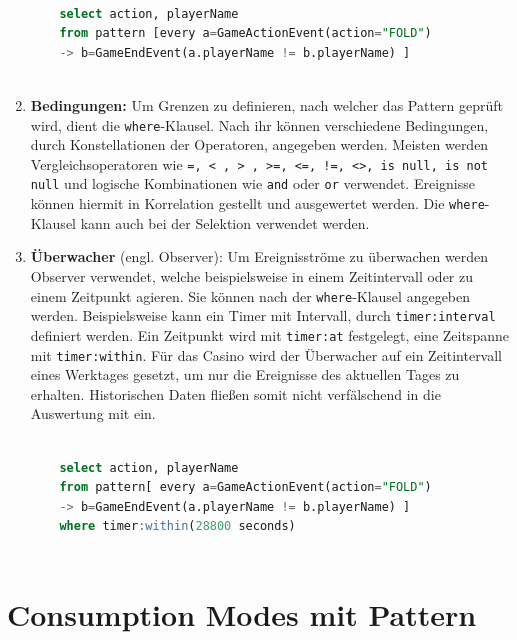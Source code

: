 \begin{enumerate}
	\begin{lstlisting}[caption={Pattern mit Follow-Operator },label=follow_pattern,captionpos=b,language=SQL]
	
	select action, playerName 
	from pattern [every a=GameActionEvent(action="FOLD") 
	-> b=GameEndEvent(a.playerName != b.playerName) ]
	
	\end{lstlisting}
	
	\item \textbf{Bedingungen:}
	Um Grenzen zu definieren, nach welcher das Pattern geprüft wird, dient die \texttt{where}-Klausel. Nach ihr können verschiedene Bedingungen, durch Konstellationen der Operatoren, angegeben werden.
	Meisten werden Vergleichsoperatoren wie \texttt{=, < , > , >=, <=, !=, <>, is null, is not null} und logische Kombinationen wie \texttt{and} oder \texttt{or} verwendet. Ereignisse können hiermit in Korrelation gestellt und ausgewertet werden. Die \texttt{where}- Klausel kann auch bei der Selektion verwendet werden.
	
	\item \textbf{Überwacher} (engl. Observer):
	Um Ereignisströme zu überwachen werden Observer verwendet, welche beispielsweise in einem Zeitintervall oder zu einem Zeitpunkt agieren. Sie können nach der \texttt{where}-Klausel angegeben werden. Beispielsweise kann ein Timer mit Intervall, durch \texttt{timer:interval} definiert werden. Ein Zeitpunkt wird mit \texttt{timer:at} festgelegt, eine Zeitspanne mit \texttt{timer:within}. Für das Casino wird der Überwacher auf ein Zeitintervall eines Werktages gesetzt, um nur die Ereignisse des aktuellen Tages zu erhalten. Historischen Daten fließen somit nicht verfälschend in die Auswertung mit ein.
	
	\begin{lstlisting}[caption={Pattern mit Observer },label=observer_pattern,captionpos=b,language=SQL]
	
	select action, playerName 
	from pattern[ every a=GameActionEvent(action="FOLD") 
	-> b=GameEndEvent(a.playerName != b.playerName) ]
	where timer:within(28800 seconds)
	
	\end{lstlisting}
	
\end{enumerate}

\section{Consumption Modes mit Pattern}

